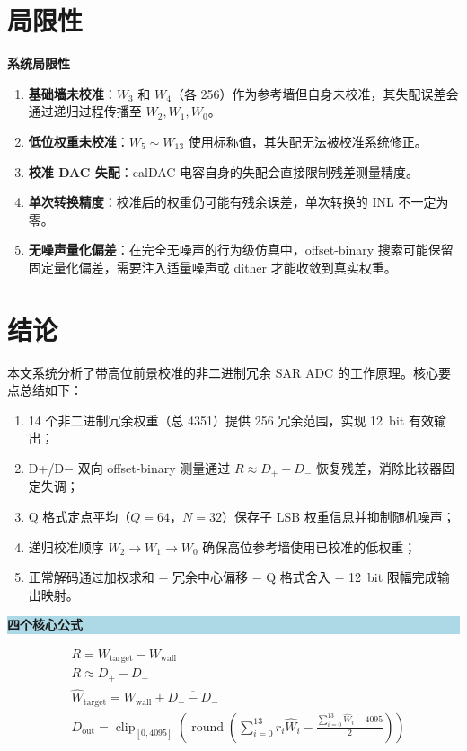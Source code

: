 \documentclass[
  UTF8,
  a4paper,
  11pt,
  oneside,
  fontset=fandol
]{ctexrep}
\newenvironment{keybox}[1]{%
  \begin{center}
  \begin{minipage}{0.94\textwidth}
  \colorbox{lightblue}{%
    \parbox{0.96\textwidth}{\textbf{#1}}}
  \vspace{0.35em}\par
}{%
  \end{minipage}
  \end{center}
}
\newenvironment{warnbox}[1]{%
  \begin{center}
  \begin{minipage}{0.94\textwidth}
  \colorbox{lightorange}{%
    \parbox{0.96\textwidth}{\textbf{#1}}}
  \vspace{0.35em}\par
}{%
  \end{minipage}
  \end{center}
}
\newcommand{\clip}{\operatorname{clip}}
\newcommand{\round}{\operatorname{round}}
\newcommand{\What}{\widehat{W}}
\newcommand{\Dout}{D_{\mathrm{out}}}
\newcommand{\clipop}[1]{\clip_{[0,4095]}\!\left(#1\right)}
\newcommand{\roundop}[1]{\round\!\left(#1\right)}
\begin{document}
\chapter{局限性}

\begin{warnbox}{系统局限性}
\begin{enumerate}[leftmargin=1.5em,itemsep=2pt]
    \item \textbf{基础墙未校准}：$W_3$ 和 $W_4$（各 \SI{256}{\LSB}）作为参考墙但自身未校准，其失配误差会通过递归过程传播至 $W_2, W_1, W_0$。
    \item \textbf{低位权重未校准}：$W_5 \sim W_{13}$ 使用标称值，其失配无法被校准系统修正。
    \item \textbf{校准 DAC 失配}：calDAC 电容自身的失配会直接限制残差测量精度。
    \item \textbf{单次转换精度}：校准后的权重仍可能有残余误差，单次转换的 INL 不一定为零。
    \item \textbf{无噪声量化偏差}：在完全无噪声的行为级仿真中，offset-binary 搜索可能保留固定量化偏差，需要注入适量噪声或 dither 才能收敛到真实权重。
\end{enumerate}
\end{warnbox}

\chapter{结论}

本文系统分析了带高位前景校准的非二进制冗余 SAR ADC 的工作原理。核心要点总结如下：

\begin{enumerate}[leftmargin=2em]
    \item 14 个非二进制冗余权重（总 \SI{4351}{\LSB}）提供 \SI{256}{\LSB} 冗余范围，实现 \SI{12}{bit} 有效输出；
    \item D+/D$-$ 双向 offset-binary 测量通过 $R \approx D_+ - D_-$ 恢复残差，消除比较器固定失调；
    \item Q 格式定点平均（$Q = 64$，$N = 32$）保存子 LSB 权重信息并抑制随机噪声；
    \item 递归校准顺序 $W_2 \to W_1 \to W_0$ 确保高位参考墙使用已校准的低权重；
    \item 正常解码通过加权求和 $-$ 冗余中心偏移 $-$ Q 格式舍入 $-$ \SI{12}{bit} 限幅完成输出映射。
\end{enumerate}

\begin{keybox}{四个核心公式}
\begin{align}
& R = W_{\mathrm{target}} - W_{\mathrm{wall}} \label{eq:core1} \\
& R \approx D_+ - D_- \label{eq:core2} \\
& \What_{\mathrm{target}} = W_{\mathrm{wall}} + \overline{D_+ - D_-} \label{eq:core3} \\
& \Dout = \clipop{\roundop{\sum_{i=0}^{13} r_i \What_i - \frac{\sum_{i=0}^{13} \What_i - 4095}{2}}} \label{eq:core4}
\end{align}
\end{keybox}
\end{document}

